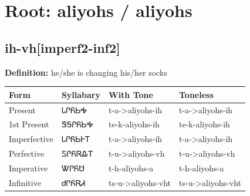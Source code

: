 \documentclass{article}%
\begin{document}
%
\normalsize%
\section*{Root: aliyohs / aliyohs}%
\subsection*{ih-vh[imperf2-inf2]}%
\textbf{Definition: }%
he/she is changing his/her socks%
\\[0.5em]%
\begin{tabular}{|l|l|l|l|}%
\hline%
\textbf{Form}&\textbf{Syllabary}&\textbf{With Tone}&\textbf{Toneless}\\%
\hline%
Present&ᏓᎵᏲᏏᎭ&t{-}a{-}>aliyohs{-}ih&t{-}a{-}>aliyohs{-}ih\\%
1st Present&ᏕᎦᎵᏲᏏᎭ&te{-}k{-}aliyohs{-}ih&te{-}k{-}aliyohs{-}ih\\%
Imperfective&ᏓᎵᏲᏏᎰᎢ&t{-}a{-}>aliyohs{-}ih&t{-}a{-}>aliyohs{-}ih\\%
Perfective&ᏚᎵᏲᏒᎲᎢ&t{-}u{-}>aliyohs{-}vh&t{-}u{-}>aliyohs{-}vh\\%
Imperative&ᏔᎵᏲᏌ&t{-}h{-}aliyohs{-}a&t{-}h{-}aliyohs{-}a\\%
Infinitive&ᏧᎵᏲᏒᏗ&ts{-}u{-}>aliyohs{-}vht&ts{-}u{-}>aliyohs{-}vht\\%
\hline%
\end{tabular}%
\\[1em]%
\end{document}
